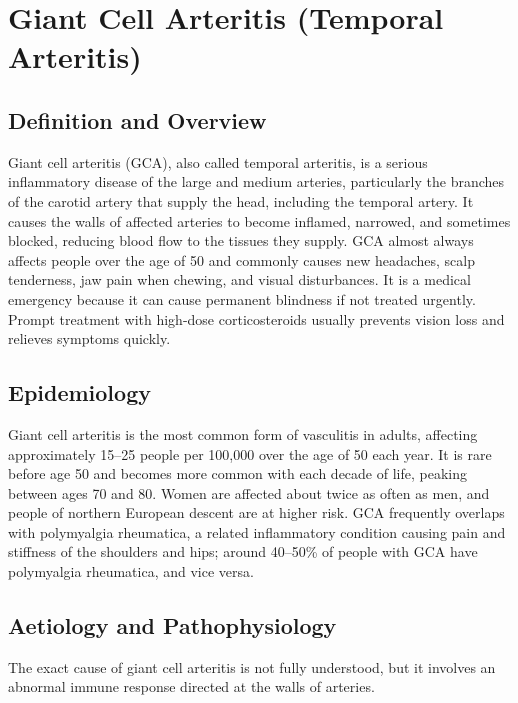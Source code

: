 \chapter{Giant Cell Arteritis (Temporal Arteritis)}

\section*{Definition and Overview}
Giant cell arteritis (GCA), also called temporal arteritis, is a serious inflammatory disease of the large and medium arteries, particularly the branches of the carotid artery that supply the head, including the temporal artery. It causes the walls of affected arteries to become inflamed, narrowed, and sometimes blocked, reducing blood flow to the tissues they supply. GCA almost always affects people over the age of 50 and commonly causes new headaches, scalp tenderness, jaw pain when chewing, and visual disturbances. It is a medical emergency because it can cause permanent blindness if not treated urgently. Prompt treatment with high-dose corticosteroids usually prevents vision loss and relieves symptoms quickly.

\section*{Epidemiology}
Giant cell arteritis is the most common form of vasculitis in adults, affecting approximately 15--25 people per 100,000 over the age of 50 each year. It is rare before age 50 and becomes more common with each decade of life, peaking between ages 70 and 80. Women are affected about twice as often as men, and people of northern European descent are at higher risk. GCA frequently overlaps with polymyalgia rheumatica, a related inflammatory condition causing pain and stiffness of the shoulders and hips; around 40--50\% of people with GCA have polymyalgia rheumatica, and vice versa.

\section*{Aetiology and Pathophysiology}
The exact cause of giant cell arteritis is not fully understood, but it involves an abnormal immune response directed at the walls of arteries.

